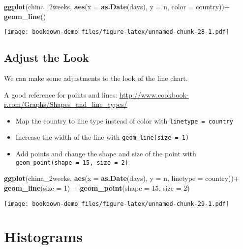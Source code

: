 \documentclass[]{book}
\newenvironment{Shaded}{\begin{snugshade}}{\end{snugshade}}
\newcommand{\KeywordTok}[1]{\textcolor[rgb]{0.13,0.29,0.53}{\textbf{{#1}}}}
\newcommand{\DataTypeTok}[1]{\textcolor[rgb]{0.13,0.29,0.53}{{#1}}}
\newcommand{\DecValTok}[1]{\textcolor[rgb]{0.00,0.00,0.81}{{#1}}}
\newcommand{\StringTok}[1]{\textcolor[rgb]{0.31,0.60,0.02}{{#1}}}
\newcommand{\NormalTok}[1]{{#1}}
\theoremstyle{definition}
\theoremstyle{definition}
\theoremstyle{remark}
\begin{document}
\begin{Shaded}
\begin{Highlighting}[]
\KeywordTok{ggplot}\NormalTok{(china_2weeks, }\KeywordTok{aes}\NormalTok{(}\DataTypeTok{x =} \KeywordTok{as.Date}\NormalTok{(days), }\DataTypeTok{y =} \NormalTok{n, }\DataTypeTok{color =} \NormalTok{country))+}
\StringTok{  }\KeywordTok{geom_line}\NormalTok{()}
\end{Highlighting}
\end{Shaded}

\texttt{[image: bookdown-demo\_files/figure-latex/unnamed-chunk-28-1.pdf]}

\section{Adjust the Look}\label{adjust-the-look}

We can make some adjustments to the look of the line chart.

A good reference for points and lines:
\url{http://www.cookbook-r.com/Graphs/Shapes_and_line_types/}

\begin{itemize}
\item
  Map the country to line type instead of color with
  \texttt{linetype\ =\ country}
\item
  Increase the width of the line with \texttt{geom\_line(size\ =\ 1)}
\item
  Add points and change the shape and size of the point with
  \texttt{geom\_point(shape\ =\ 15,\ size\ =\ 2)}
\end{itemize}

\begin{Shaded}
\begin{Highlighting}[]
\KeywordTok{ggplot}\NormalTok{(china_2weeks, }\KeywordTok{aes}\NormalTok{(}\DataTypeTok{x =} \KeywordTok{as.Date}\NormalTok{(days), }\DataTypeTok{y =} \NormalTok{n, }\DataTypeTok{linetype =} \NormalTok{country))+}
\StringTok{  }\KeywordTok{geom_line}\NormalTok{(}\DataTypeTok{size =} \DecValTok{1}\NormalTok{) +}
\StringTok{  }\KeywordTok{geom_point}\NormalTok{(}\DataTypeTok{shape =} \DecValTok{15}\NormalTok{, }\DataTypeTok{size =} \DecValTok{2}\NormalTok{)}
\end{Highlighting}
\end{Shaded}

\texttt{[image: bookdown-demo\_files/figure-latex/unnamed-chunk-29-1.pdf]}

\chapter{Histograms}\label{histograms}
\end{document}
